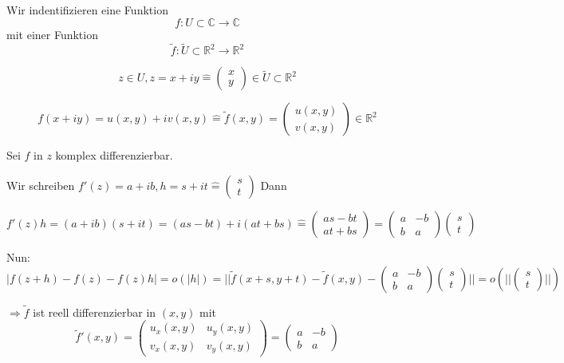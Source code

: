 \documentclass[10pt,a4paper]{article}
\begin{document}
Wir indentifizieren eine Funktion $$f: U \subset \mathbb{C} \rightarrow \mathbb{C}$$ mit einer Funktion $$ \tilde{f}: \tilde{U} \subset\mathbb{R}^{2} \rightarrow \mathbb{R}^{2}$$

$$z \in U, z=x+iy \hat{=} \begin{pmatrix}
x \\y
\end{pmatrix} \in \tilde{U} \subset \mathbb{R}^{2}
$$

$$f(x+iy)=u(x,y)+iv(x,y)\hat{=} \tilde{f}(x,y)=\begin{pmatrix}
u(x,y)\\v(x,y)
\end{pmatrix} \in \mathbb{R}^{2}$$

Sei $f$ in $z$ komplex differenzierbar.

Wir schreiben $f'(z)=a+ib, h=s+it \hat{=} \begin{pmatrix}
s\\t
\end{pmatrix}  $ Dann

$f'(z)h=(a+ib)(s+it)=(as-bt)+i(at+bs)\hat{=}\begin{pmatrix}
as-bt \\at+bs
\end{pmatrix} = \begin{pmatrix}
a & -b \\ b& a
\end{pmatrix}  \begin{pmatrix}
s \\t
\end{pmatrix} $

Nun: $|f(z+h)-f(z)-f(z)h|=o(|h|) \hat{=} ||\tilde{f}(x+s,y+t)-\tilde{f}(x,y)- \begin{pmatrix}
a & -b \\ b& a
\end{pmatrix}  \begin{pmatrix}
s \\t
\end{pmatrix} || = o(|| \begin{pmatrix}
s\\t
\end{pmatrix} ||)$


$\Rightarrow \tilde{f}$ ist reell differenzierbar in $(x,y)$ mit $$\tilde{f}'(x,y)= \begin{pmatrix}
u_x(x,y) & u_y(x,y)\\
v_x(x,y) & v_y(x,y)
\end{pmatrix} = \begin{pmatrix}
a & -b \\ b & a
\end{pmatrix} $$
\end{document}
